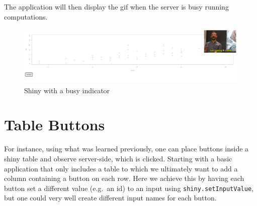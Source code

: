 \documentclass[
]{krantz}
\makeatletter
\newenvironment{Shaded}{\begin{snugshade}}{\end{snugshade}}
\newcommand{\ControlFlowTok}[1]{\textcolor[rgb]{0.27,0.27,0.27}{\textbf{#1}}}
\newcommand{\DataTypeTok}[1]{\textcolor[rgb]{0.27,0.27,0.27}{#1}}
\newcommand{\KeywordTok}[1]{\textcolor[rgb]{0.27,0.27,0.27}{\textbf{#1}}}
\newcommand{\NormalTok}[1]{#1}
\newcommand{\OperatorTok}[1]{\textcolor[rgb]{0.43,0.43,0.43}{\textbf{#1}}}
\newcommand{\OtherTok}[1]{\textcolor[rgb]{0.37,0.37,0.37}{#1}}
\newcommand{\StringTok}[1]{\textcolor[rgb]{0.5,0.5,0.5}{#1}}
\newenvironment{kframe}{%
\medskip{}
\setlength{\fboxsep}{.8em}
 \def\at@end@of@kframe{}%
 \ifinner\ifhmode%
  \def\at@end@of@kframe{\end{minipage}}%
  \begin{minipage}{\columnwidth}%
 \fi\fi%
 \def\FrameCommand##1{\hskip\@totalleftmargin \hskip-\fboxsep
 \colorbox{shadecolor}{##1}\hskip-\fboxsep
     \hskip-\linewidth \hskip-\@totalleftmargin \hskip\columnwidth}%
 \MakeFramed {\advance\hsize-\width
   \@totalleftmargin\z@ \linewidth\hsize
   \@setminipage}}%
 {\par\unskip\endMakeFramed%
 \at@end@of@kframe}
\renewenvironment{Shaded}{\begin{kframe}}{\end{kframe}}
\makeatother
\begin{document}
The application will then display the gif when the server is busy running computations.

\begin{figure}[t]

{\centering \includegraphics[width=1\linewidth]{images/shiny-events} 

}

\caption{Shiny with a busy indicator}\label{fig:shiny-events}
\end{figure}

\hypertarget{shiny-tips-table-btn}{%
\section{Table Buttons}\label{shiny-tips-table-btn}}

For instance, using what was learned previously, one can place buttons inside a shiny table and observe server-side, which is clicked. Starting with a basic application that only includes a table to which we ultimately want to add a column containing a button on each row. Here we achieve this by having each button set a different value (e.g.~an id) to an input using \texttt{shiny.setInputValue}, but one could very well create different input names for each button.

\begin{Shaded}
\end{Shaded}
\end{document}
